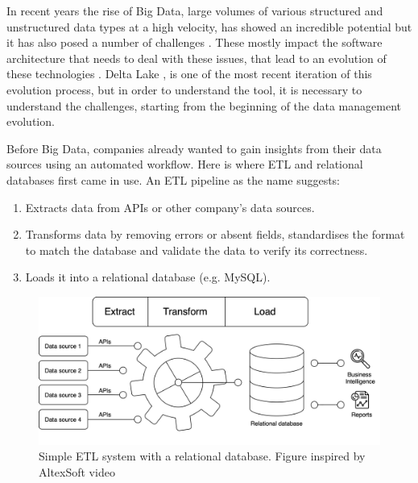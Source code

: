 In recent years the rise of Big Data, large volumes of various structured and unstructured data types at a high velocity, has showed an incredible potential but it has also posed a number of challenges \cite{penceWhatBigData2014}. These mostly impact the software architecture that needs to deal with these issues, that lead to an evolution of these technologies \cite{gortonDistributionDataDeployment2015}. Delta Lake \cite{armbrustDeltaLakeHighperformance2020}, is one of the most recent iteration of this evolution process, but in order to understand the tool, it is necessary to understand the challenges, starting from the beginning of the data management evolution.

Before Big Data, companies already wanted to gain insights from their data sources using an automated workflow. Here is where \gls{ETL} and relational databases first came in use. An \gls{ETL} pipeline as the name suggests:
\begin{enumerate}
    \item Extracts data from \glspl{API} or other company's data sources.
    \item Transforms data by removing errors or absent fields, standardises the format to match the database and validate the data to verify its correctness.
    \item Loads it into a relational database (e.g. MySQL).
\end{enumerate} 

\begin{figure}[!ht]
    \begin{center}
      \includegraphics[width=\textwidth]{figures/2-background/DeltaLake_evolution-ETL+DB.png}
    \end{center}
    \caption{Simple \gls{ETL} system with a relational database. Figure inspired by AltexSoft video \cite{altexsoftHowDataEngineering2021}}
    \label{fig:ETL+DB}
\end{figure}

